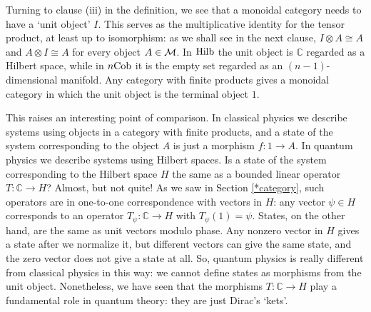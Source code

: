 \documentclass{article}
\newcommand{\Hilb}{{\rm Hilb}}
\newcommand{\Cob}{{\rm Cob}}
\newcommand{\C}{{\mathbb C}}
\newcommand{\M}{{\cal M}}
\renewcommand{\to}{\rightarrow}
\newcommand{\maps}{\colon}
\newcommand{\tensor}{\otimes}
\newcommand{\iso}{\cong}
\begin{document}
Turning to clause (iii) in the definition, we see that a monoidal
category needs to have a `unit object' $I$.  This serves as the
multiplicative identity for the tensor product, at least up to
isomorphism: as we shall see in the next clause, $I \tensor A \cong A$
and $A \tensor I \iso A$ for every object $A \in \M$.  In $\Hilb$ the
unit object is $\C$ regarded as a Hilbert space, while in $n\Cob$ it
is the empty set regarded as an $(n-1)$-dimensional manifold.  Any
category with finite products gives a monoidal category in which the
unit object is the terminal object $1$.

This raises an interesting point of comparison.  In classical physics 
we describe systems using objects in a category with finite products, 
and a state of the system corresponding to the object $A$ is just a 
morphism $f \maps 1 \to A$.  In quantum physics we describe systems 
using Hilbert spaces.  Is a state of the system corresponding to the 
Hilbert space $H$ the same as a bounded linear operator $T \maps
\C \to H$?  Almost, but not quite!  As we saw in Section \ref{*category},
such operators are in one-to-one correspondence with vectors in $H$: 
any vector $\psi \in H$ corresponds to an operator $T_\psi \maps \C \to H$ 
with $T_\psi(1) = \psi$.  States, on the other hand, are the same as
unit vectors modulo phase.  Any nonzero vector in $H$ gives a state
after we normalize it, but different vectors can give the same state,
and the zero vector does not give a state at all.  So, quantum physics 
is really different from classical physics in this way: we cannot 
define states as morphisms from the unit object.  Nonetheless, we
have seen that the morphisms $T \maps \C \to H$ play a fundamental 
role in quantum theory: they are just Dirac's `kets'.
\end{document}
